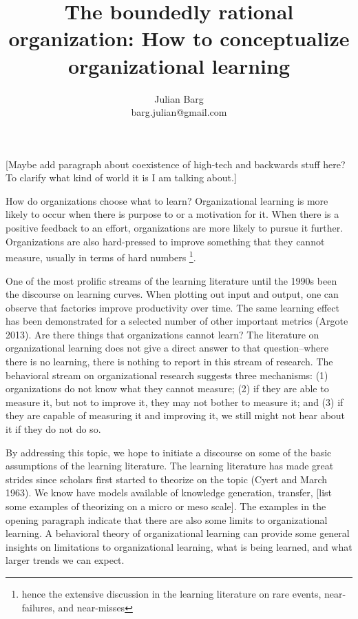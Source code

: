 \documentclass[12pt, man, natbib]{apa6}
\title{The boundedly rational organization: How to conceptualize organizational learning}
\author{Julian Barg\\barg.julian@gmail.com}
\affiliation{Ivey Business School}
\begin{document}
	
	\maketitle
	
	\singlespacing
	
	\section{}	
	
	[Maybe add paragraph about coexistence of high-tech and backwards stuff here? To clarify what kind of world it is I am talking about.]
	
	How do organizations choose what to learn? Organizational learning is more likely to occur when there is purpose to or a motivation for it. When there is a positive feedback to an effort, organizations are more likely to pursue it further. Organizations are also hard-pressed to improve something that they cannot measure, usually in terms of hard numbers \footnote{hence the extensive discussion in the learning literature on rare events, near-failures, and near-misses}.
	
	One of the most prolific streams of the learning literature until the 1990s been the discourse on learning curves. When plotting out input and output, one can observe that factories improve productivity over time. The same learning effect has been demonstrated for a selected number of other important metrics (Argote 2013). Are there things that organizations cannot learn? The literature on organizational learning does not give a direct answer to that question--where there is no learning, there is nothing to report in this stream of research. The behavioral stream on organizational research suggests three mechanisms: (1) organizations do not know what they cannot measure; (2) if they are able to measure it, but not to improve it, they may not bother to measure it; and (3) if they are capable of measuring it and improving it, we still might not hear about it if they do not do so.
	
	By addressing this topic, we hope to initiate a discourse on some of the basic assumptions of the learning literature. The learning literature has made great strides since scholars first started to theorize on the topic (Cyert and March 1963). We know have models available of knowledge generation, transfer, [list some examples of theorizing on a micro or meso scale]. The examples in the opening paragraph indicate that there are also some limits to organizational learning. A behavioral theory of organizational learning can provide some general insights on limitations to organizational learning, what is being learned, and what larger trends we can expect.
	
\end{document}
